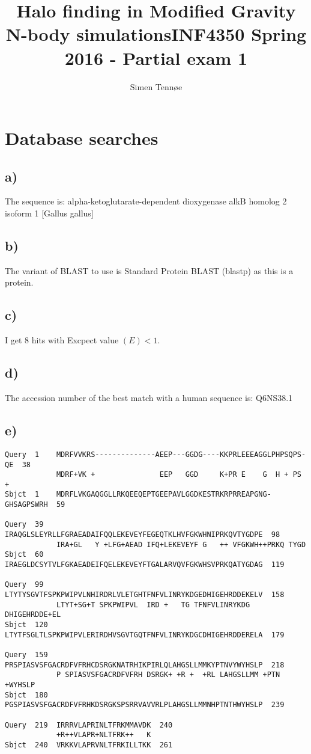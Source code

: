 \documentclass[a4paper,12pt,twoside,openright]{article}
\title{Halo finding in Modified Gravity N-body simulations}
\author{Simen Tenn\o e}
\title{INF4350 Spring 2016 - Partial exam 1}
\begin{document}
\maketitle

\section{Database searches}

\subsection*{a)}
The sequence is: alpha-ketoglutarate-dependent dioxygenase alkB homolog 2 isoform 1 [Gallus gallus]


\subsection*{b)}
The variant of BLAST to use is Standard Protein BLAST (blastp) as this is a protein.

\subsection*{c)}

I get 8 hits with Excpect value $(E) < 1$.

\subsection*{d)}

The accession number of the best match
with a human sequence is: Q6NS38.1


\subsection*{e)}
\begin{verbatim}
Query  1    MDRFVVKRS--------------AEEP---GGDG----KKPRLEEEAGGLPHPSQPS-QE  38
            MDRF+VK +               EEP   GGD     K+PR E    G  H + PS +
Sbjct  1    MDRFLVKGAQGGLLRKQEEQEPTGEEPAVLGGDKESTRKRPRREAPGNG-GHSAGPSWRH  59

Query  39   IRAQGLSLEYRLLFGRAEADAIFQQLEKEVEYFEGEQTKLHVFGKWHNIPRKQVTYGDPE  98
            IRA+GL   Y +LFG+AEAD IFQ+LEKEVEYF G   ++ VFGKWH++PRKQ TYGD
Sbjct  60   IRAEGLDCSYTVLFGKAEADEIFQELEKEVEYFTGALARVQVFGKWHSVPRKQATYGDAG  119

Query  99   LTYTYSGVTFSPKPWIPVLNHIRDRLVLETGHTFNFVLINRYKDGEDHIGEHRDDEKELV  158
            LTYT+SG+T SPKPWIPVL  IRD +   TG TFNFVLINRYKDG DHIGEHRDDE+EL
Sbjct  120  LTYTFSGLTLSPKPWIPVLERIRDHVSGVTGQTFNFVLINRYKDGCDHIGEHRDDERELA  179

Query  159  PRSPIASVSFGACRDFVFRHCDSRGKNATRHIKPIRLQLAHGSLLMMKYPTNVYWYHSLP  218
            P SPIASVSFGACRDFVFRH DSRGK+ +R +  +RL LAHGSLLMM +PTN +WYHSLP
Sbjct  180  PGSPIASVSFGACRDFVFRHKDSRGKSPSRRVAVVRLPLAHGSLLMMNHPTNTHWYHSLP  239

Query  219  IRRRVLAPRINLTFRKMMAVDK  240
            +R++VLAPR+NLTFRK++   K
Sbjct  240  VRKKVLAPRVNLTFRKILLTKK  261
\end{verbatim}
\end{document}
